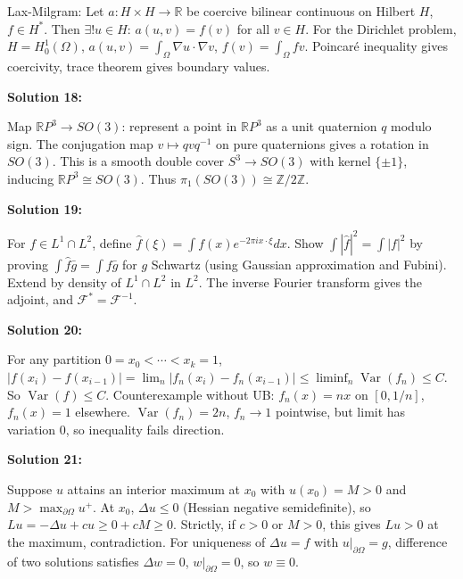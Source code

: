 \documentclass[12pt,a4paper]{exam}
\begin{document}
Lax-Milgram: Let $a: H \times H \to \mathbb{R}$ be coercive bilinear continuous on Hilbert $H$, $f \in H^*$. Then $\exists! u \in H$: $a(u,v) = f(v)$ for all $v \in H$. For the Dirichlet problem, $H = H_0^1(\Omega)$, $a(u,v) = \int_\Omega \nabla u \cdot \nabla v$, $f(v) = \int_\Omega f v$. Poincar\'e inequality gives coercivity, trace theorem gives boundary values.

\vspace{0.5cm}

\textbf{Solution 18:}

Map $\mathbb{R}P^3 \to SO(3)$: represent a point in $\mathbb{R}P^3$ as a unit quaternion $q$ modulo sign. The conjugation map $v \mapsto q v q^{-1}$ on pure quaternions gives a rotation in $SO(3)$. This is a smooth double cover $S^3 \to SO(3)$ with kernel $\{\pm1\}$, inducing $\mathbb{R}P^3 \cong SO(3)$. Thus $\pi_1(SO(3)) \cong \mathbb{Z}/2\mathbb{Z}$.

\vspace{0.5cm}

\textbf{Solution 19:}

For $f \in L^1 \cap L^2$, define $\widehat{f}(\xi) = \int f(x) e^{-2\pi i x \cdot \xi} dx$. Show $\int |\widehat{f}|^2 = \int |f|^2$ by proving $\int \widehat{f} \bar{g} = \int f \bar{g}$ for $g$ Schwartz (using Gaussian approximation and Fubini). Extend by density of $L^1 \cap L^2$ in $L^2$. The inverse Fourier transform gives the adjoint, and $\mathcal{F}^* = \mathcal{F}^{-1}$.

\vspace{0.5cm}

\textbf{Solution 20:}

For any partition $0 = x_0 < \cdots < x_k = 1$, $|f(x_i) - f(x_{i-1})| = \lim_n |f_n(x_i) - f_n(x_{i-1})| \leq \liminf_n \operatorname{Var}(f_n) \leq C$. So $\operatorname{Var}(f) \leq C$. Counterexample without UB: $f_n(x) = n x$ on $[0,1/n]$, $f_n(x)=1$ elsewhere. $\operatorname{Var}(f_n) = 2n$, $f_n \to 1$ pointwise, but limit has variation 0, so inequality fails direction.

\vspace{0.5cm}

\textbf{Solution 21:}

Suppose $u$ attains an interior maximum at $x_0$ with $u(x_0) = M > 0$ and $M > \max_{\partial\Omega} u^+$. At $x_0$, $\Delta u \leq 0$ (Hessian negative semidefinite), so $Lu = -\Delta u + c u \geq 0 + cM \geq 0$. Strictly, if $c>0$ or $M>0$, this gives $Lu > 0$ at the maximum, contradiction. For uniqueness of $\Delta u = f$ with $u|_{\partial\Omega} = g$, difference of two solutions satisfies $\Delta w = 0$, $w|_{\partial\Omega} = 0$, so $w \equiv 0$.
\end{document}
